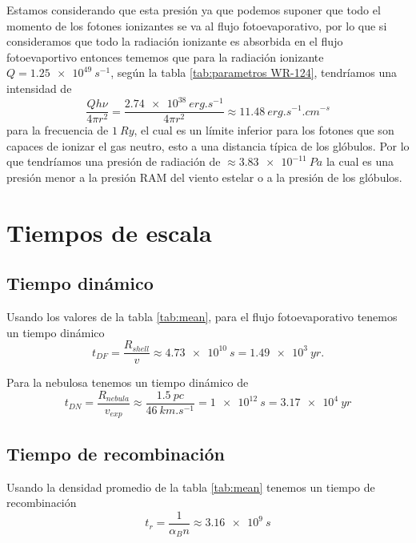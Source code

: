 \documentclass{book}
\begin{document}
Estamos considerando que esta presión ya que podemos suponer que todo el momento de los fotones ionizantes se va al flujo fotoevaporativo, por lo que si consideramos que todo la radiación ionizante es absorbida en el flujo fotoevaportivo entonces tememos que para la radiación ionizante $Q = \SI{1.25e49}{s^{-1}}$, según la tabla \ref{tab:parametros WR-124}, tendríamos una intensidad de \[\frac{Q h\nu}{4\pi r^2} = \frac{\SI{2.74e38}{erg.s^{-1}}}{4\pi r^2} \approx \SI{11.48}{erg.s^{-1}.cm^{-s}}\] para la frecuencia de $\SI{1}{Ry}$, el cual es un límite inferior para los fotones que son capaces de ionizar el gas neutro, esto a una distancia típica de los glóbulos. Por lo que tendríamos una presión de radiación de $\approx \SI{3.83e-11}{Pa}$ la cual es una presión menor a la presión RAM del viento estelar o a la presión de los glóbulos.

\chapter{Tiempos de escala}

\section{Tiempo dinámico}

Usando los valores de la tabla \ref{tab:mean}, para el flujo fotoevaporativo tenemos un tiempo dinámico \[t_{DF} = \frac{R_{shell}}{v} \approx \SI{4.73e10}{s}  = \SI{1.49e3}{yr}.\]

Para la nebulosa tenemos un tiempo dinámico de \[t_{DN}= \frac{R_{nebula}}{v_{exp}}\approx\frac{\SI{1.5}{pc}}{\SI{46}{km.s^{-1}}}= \SI{1e12}{s}=\SI{3.17e4}{yr}\]

\section{Tiempo de recombinación}

Usando la densidad promedio de la tabla \ref{tab:mean} tenemos un tiempo de recombinación 
\[t_r = \frac{1}{\alpha_B n} \approx \SI{3.16e9}{s}\]


\end{document}
